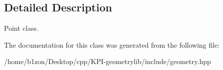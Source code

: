 \subsection{Detailed Description}
Point class. 

The documentation for this class was generated from the following file\+:\begin{DoxyCompactItemize}
\item 
/home/b1zon/\+Desktop/cpp/\+K\+P\+I-\/geometrylib/include/geometry.\+hpp\end{DoxyCompactItemize}
